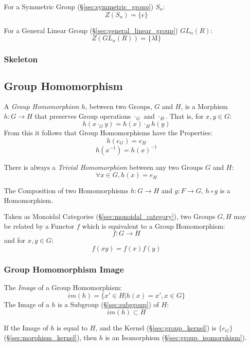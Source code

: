 For a Symmetric Group (\S\ref{sec:symmetric_group}) $S_n$:
\[
    Z(S_n) = \{e\}
\]

For a General Linear Group (\S\ref{sec:general_linear_group})
$GL_n(R)$:
\[
    Z(GL_n(R)) = \{\lambda \mathrm{I}\}
\]



\subsubsection{Skeleton}\label{sec:group_skeleton}



\subsection{Group Homomorphism}\label{sec:group_homomorphism}

A \emph{Group Homomorphism} $h$, between two Groups, $G$ and $H$, is a
Morphism $h : G \rightarrow H$ that preserves Group operations
$\cdot_G$ and $\cdot_H$. That is, for $x,y \in G$:
\[
    h(x \cdot_G y) = h(x) \cdot_H h(y)
\]
From this it follows that Group Homomorphisms have the Properties:
\[
    h(e_G) = e_H
\]\[
    h(x^{-1}) = h(x)^{-1}
\]

There is always a \emph{Trivial Homomorphism} between any two Groups
$G$ and $H$:
\[
    \forall x \in G, h (x) = e_H
\]

The Composition of two Homomorphisms $h : G \rightarrow H$ and $g : F
\rightarrow G$, $h \circ g$ is a Homomorphism.

Taken as Monoidal Categories (\S\ref{sec:monoidal_category}), two
Groups $G, H$ may be related by a Functor $f$ which is equivalent to a
Group Homomorphism:
\[
    f : G \rightarrow H
\]
and for $x,y \in G$:
\[
    f(xy) = f(x)f(y)
\]



\subsubsection{Group Homomorphism Image}\label{sec:group_image}

The \emph{Image} of a Group Homomorphism:
\[
    im(h) = \{ x' \in H | h(x) = x', x \in G \}
\]
The Image of a $h$ is a Subgroup (\S\ref{sec:subgroup}) of $H$:
\[
    im(h) \subset H
\]

If the Image of $h$ is equal to $H$, and the Kernel
(\S\ref{sec:group_kernel}) is $\{e_G\}$ (\S\ref{sec:morphism_kernel}),
then $h$ is an Isomorphism (\S\ref{sec:group_isomorphism}).



